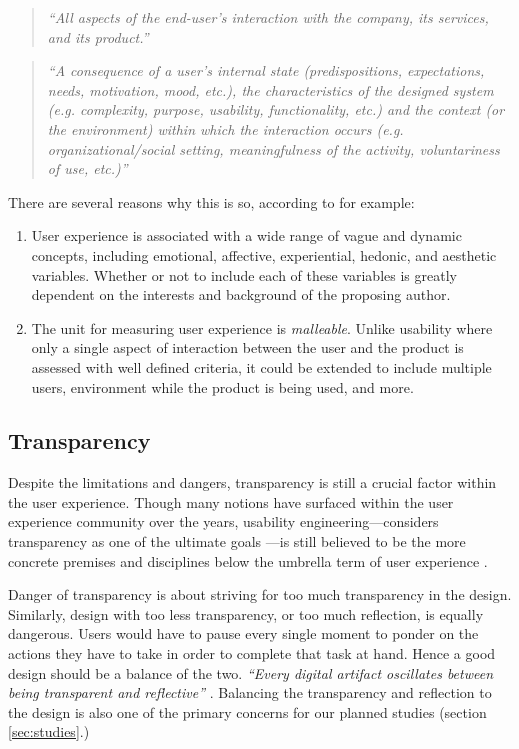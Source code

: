 \documentclass[a4paper,titlepage]{article}
\begin{document}
\begin{quote}
  {\it ``All aspects of the end-user's interaction with the company,
    its services, and its product.''}

  \raggedleft \citet{experience:nielsen}
\end{quote}

\begin{quote}
  {\it ``A consequence of a user's internal state (predispositions,
    expectations, needs, motivation, mood, etc.), the characteristics
    of the designed system (e.g. complexity, purpose, usability,
    functionality, etc.) and the context (or the environment) within
    which the interaction occurs (e.g. organizational/social setting,
    meaningfulness of the activity, voluntariness of use, etc.)''}

  \raggedleft \citet{ux:hassenzahl}
\end{quote}

There are several reasons why this is so, according to \citet{ux:law}
for example:
\begin{enumerate}
  \item User experience is associated with a wide range of vague and
    dynamic concepts, including emotional, affective, experiential,
    hedonic, and aesthetic variables. Whether or not to include each
    of these variables is greatly dependent on the interests and
    background of the proposing author.
  \item The unit for measuring user experience is
    \textit{malleable}. Unlike usability where only a single aspect of
    interaction between the user and the product is assessed with well
    defined criteria, it could be extended to include multiple users,
    environment while the product is being used, and more.
\end{enumerate}

\subsection{Transparency}
Despite the limitations and dangers, transparency is still a crucial
factor within the user experience. Though many notions have surfaced
within the user experience community over the years, usability
engineering---considers transparency as one of the ultimate goals
\citep{transparency:rutkoski}---is still believed to be the more
concrete premises and disciplines below the umbrella term of user
experience \citep{future:memmel}.

Danger of transparency is about striving for too much transparency in
the design. Similarly, design with too less transparency, or too much
reflection, is equally dangerous. Users would have to pause every
single moment to ponder on the actions they have to take in order to
complete that task at hand. Hence a good design should be a balance of
the two. {\it ``Every digital artifact oscillates between being
  transparent and reflective''} \citep[p.~6]{windows:bolter}.
Balancing the transparency and reflection to the design is also one of
the primary concerns for our planned studies (section
\ref{sec:studies}.)
\end{document}
